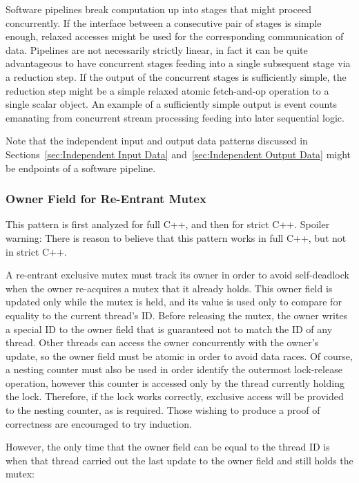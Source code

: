 \documentclass[10]{article}
\begin{document}
Software pipelines break computation up into stages that might proceed
concurrently.
If the interface between a consecutive pair of stages is simple enough,
relaxed accesses might be used for the corresponding communication of data.
Pipelines are not necessarily strictly linear, in fact it can be quite
advantageous to have concurrent stages feeding into a single subsequent
stage via a reduction step.
If the output of the concurrent stages is sufficiently simple, the
reduction step might be a simple relaxed atomic fetch-and-op operation
to a single scalar object.
An example of a sufficiently simple output is event counts emanating from
concurrent stream processing feeding into later sequential logic.

Note that the independent input and output data patterns discussed in
Sections~\ref{sec:Independent Input Data} and~\ref{sec:Independent Output Data}
might be endpoints of a software pipeline.

\subsubsection{Owner Field for Re-Entrant Mutex}
\label{sec:Owner Field for Re-Entrant Mutex}

This pattern is first analyzed for full C++, and then for strict C++.
Spoiler warning:  There is reason to believe that this pattern works
in full C++, but not in strict C++.

A re-entrant exclusive mutex must track its owner in order to avoid
self-deadlock when the owner re-acquires a mutex that it already holds.
This owner field is updated only while the mutex is held, and its value
is used only to compare for equality to the current thread's ID.
Before releasing the mutex, the owner writes a special ID to the owner
field that is guaranteed not to match the ID of any thread.
Other threads can access the owner concurrently with the owner's
update, so the owner field must be atomic in order to avoid data races.
Of course, a nesting counter must also be used in order identify the
outermost lock-release operation, however this counter is accessed only
by the thread currently holding the lock.
Therefore, if the lock works correctly, exclusive access will be provided
to the nesting counter, as is required.
Those wishing to produce a proof of correctness are encouraged to try
induction.

However, the only time that the owner field can be equal to the thread ID
is when that thread carried out the last update to the owner field and
still holds the mutex:
\end{document}
